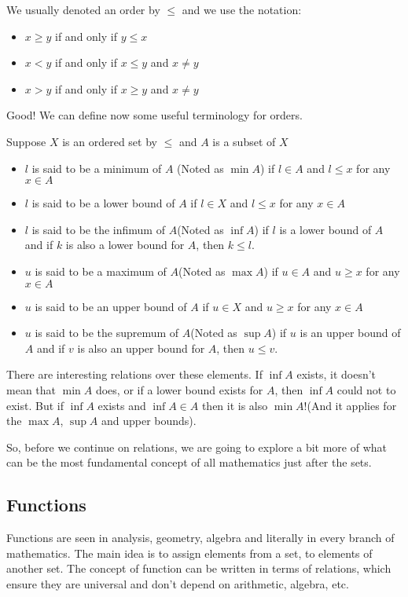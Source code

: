 \documentclass{tufte-handout}
\begin{document}
We usually denoted an order by $\le$ and we use the notation:
\begin{itemize}
	\item $x \ge y$ if and only if $y \le x$
	\item $x < y$ if and only if $x \le y$ and $x \neq y$
	\item $x > y$ if and only if $x \ge y$ and $x \neq y$
\end{itemize}

Good! We can define now some useful terminology for orders.
\begin{definition}
	Suppose $X$ is an ordered set by $\le$ and $A$ is a subset of $X$
	\begin{itemize}
		\item $l$ is said to be a minimum of $A$ (Noted as $\min A$) if $l \in A$ and $l \le x$ for any $x \in A$
		\item $l$ is said to be a lower bound of $A$ if $l \in X$ and $l \le x$ for any $x \in A$
		\item $l$ is said to be the infimum of $A$(Noted as $\inf A$) if $l$ is a lower bound of $A$ and if $k$ is also a lower bound for $A$, then $k \le l$.
		\item $u$ is said to be a maximum of $A$(Noted as $\max A$) if $u \in A$ and $u \ge x$ for any $x \in A$
		\item $u$ is said to be an upper bound of $A$ if $u \in X$ and $u \ge x$ for any $x \in A$
		\item $u$ is said to be the supremum of $A$(Noted as $\sup A$) if $u$ is an upper bound of $A$ and if $v$ is also an upper bound for $A$, then $u \le v$.
	\end{itemize}
\end{definition}

There are interesting relations over these elements. If $\inf A$ exists, it doesn't mean that $\min A$ does, or if a lower bound exists for $A$, then $\inf A$ could not to exist. But if $\inf A$ exists and $\inf A \in A$ then it is also $\min A$!(And it applies for the $\max A$, $\sup A$ and upper bounds).

So, before we continue on relations, we are going to explore a bit more of what can be the most fundamental concept of all mathematics just after the sets.

\subsection{Functions}
Functions are seen in analysis, geometry, algebra and literally in every branch of mathematics. The main idea is to assign elements from a set, to elements of another set. The concept of function can be written in terms of relations, which ensure they are universal and don't depend on arithmetic, algebra, etc.
\end{document}

